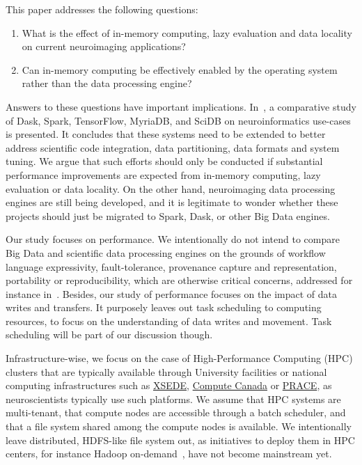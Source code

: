 \documentclass{IEEEtran}
\begin{document}
This paper addresses the following questions:
\begin{enumerate}
\item What is the effect of in-memory computing, lazy evaluation and data locality on current neuroimaging applications?
\item Can in-memory computing be effectively enabled by the operating system rather than the data processing engine?
\end{enumerate}

Answers to these questions have important implications. 
In~\cite{mehta2017comparative}, a comparative study of Dask, Spark, 
TensorFlow, MyriaDB, and SciDB on neuroinformatics use-cases is 
presented. It concludes that these systems need to be extended to 
better address scientific code integration, data partitioning, data 
formats and system tuning. We argue 
that such efforts should only be conducted if substantial performance 
improvements are expected from in-memory computing, lazy 
evaluation or data 
locality. On the other hand, neuroimaging data processing engines are 
still being developed, and it is legitimate to wonder whether these 
projects should just be migrated to Spark, Dask, or other Big Data 
engines.

Our study focuses on performance. We intentionally do not intend to 
compare Big Data and scientific data processing engines on the grounds 
of workflow language expressivity, fault-tolerance, provenance capture 
and representation, portability or reproducibility, which are otherwise 
critical concerns, addressed for instance in~\cite{samba}. Besides, our 
study of performance focuses on the impact of data writes and 
transfers. It purposely leaves out task scheduling to computing 
resources, to focus on the understanding of 
data writes and movement. Task scheduling will be part of our 
discussion though.

Infrastructure-wise, we focus on the case of High-Performance Computing 
(HPC) clusters that are typically available through University 
facilities or national computing infrastructures such as 
\href{xsede.org}{XSEDE}, \href{http://computecanada.ca}{Compute Canada} 
or \href{http://www.prace-ri.eu}{PRACE}, as neuroscientists typically use such platforms.
 We assume that HPC systems are 
multi-tenant, that compute nodes are accessible through a batch 
scheduler, and that a file system shared among the compute nodes is 
available. We intentionally leave distributed, 
HDFS-like file system out, as initiatives to deploy them in HPC 
centers, for instance Hadoop on-demand~\cite{krishnan2011myhadoop}, have not 
become mainstream yet.
\end{document}
